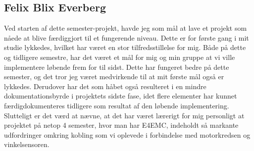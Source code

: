 \subsection*{Felix Blix Everberg}
Ved starten af dette semester-projekt, havde jeg som mål at lave et projekt som nåede at blive færdiggjort til et fungerende niveau. Dette er for første gang i mit studie lykkedes, hvilket har været en stor tilfredsstillelse for mig. Både på dette og tidligere semestre, har det været et mål for mig og min gruppe at vi ville implementere løbende frem for til sidst. Dette har fungeret bedre på dette semester, og det tror jeg været medvirkende til at mit første mål også er lykkedes. Derudover har det som håbet også resulteret i en mindre dokumentationsbyrde i projektets sidste fase, idet flere elementer har kunnet færdigdokumenteres tidligere som resultat af den løbende implementering. \\
Slutteligt er det værd at nævne, at det har været lærerigt for mig personligt at projektet på netop 4 semester, hvor man har E4EMC, indeholdt så markante udfordringer omkring kobling som vi oplevede i forbindelse med motorkredsen og vinkelsensoren. \\
